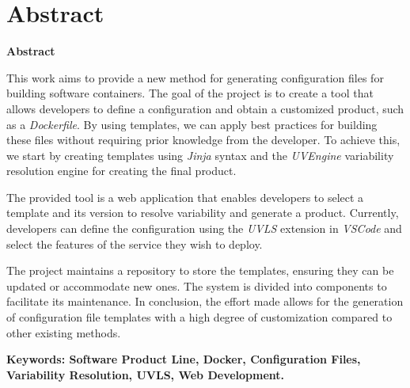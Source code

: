 \documentclass[../main.tex]{subfiles}
\begin{document}
\makeatletter
\renewenvironment{abstract}{%
    \if@twocolumn
      \section*{Abstract \\}%
    \else %
    \begin{flushright}
        {\filleft\Huge\bfseries\fontsize{48pt}{12}\selectfont Abstract\vspace{\z@}}%
        \end{flushright}
      \quotation
    \fi}
    {\if@twocolumn\else\endquotation\fi}
\makeatother
\begin{abstract}

  This work aims to provide a new method for generating configuration files for building software containers. The goal of the project is to create a tool that allows developers to define a configuration and obtain a customized product, such as a \emph{Dockerfile}. By using templates, we can apply best practices for building these files without requiring prior knowledge from the developer. To achieve this, we start by creating templates using \emph{Jinja} syntax and the \emph{UVEngine} variability resolution engine for creating the final product.

  The provided tool is a web application that enables developers to select a template and its version to resolve variability and generate a product. Currently, developers can define the configuration using the \emph{UVLS} extension in \emph{VSCode} and select the features of the service they wish to deploy.
  
  The project maintains a repository to store the templates, ensuring they can be updated or accommodate new ones. The system is divided into components to facilitate its maintenance. In conclusion, the effort made allows for the generation of configuration file templates with a high degree of customization compared to other existing methods.

\bfseries{\large{Keywords:}} Software Product Line, Docker, Configuration Files, Variability Resolution, UVLS, Web Development.

\end{abstract}
\end{document}
